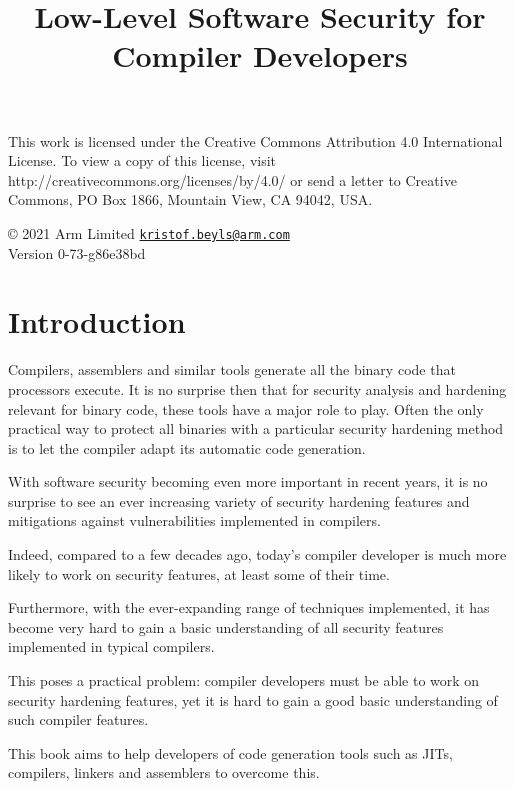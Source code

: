 \documentclass[a4paper,]{report}
\title{Low-Level Software Security for Compiler Developers}
\date{}
\begin{document}
\maketitle

\clearpage

\vspace*{\fill}
This work is licensed under the Creative Commons Attribution 4.0 International
License. To view a copy of this license, visit
http://creativecommons.org/licenses/by/4.0/ or send a letter to Creative
Commons, PO Box 1866, Mountain View, CA 94042, USA.

  © 2021 Arm Limited
  \href{mailto:kristof.beyls@arm.com}{\nolinkurl{kristof.beyls@arm.com}}\\

Version 0-73-g86e38bd
\clearpage

{
\hypersetup{linkcolor=}
\setcounter{tocdepth}{2}
\tableofcontents
}
\hypertarget{introduction}{%
\chapter{Introduction}\label{introduction}}

Compilers, assemblers and similar tools generate all the binary code
that processors execute. It is no surprise then that for security
analysis and hardening relevant for binary code, these tools have a
major role to play. Often the only practical way to protect all binaries
with a particular security hardening method is to let the compiler adapt
its automatic code generation.

With software security becoming even more important in recent years, it
is no surprise to see an ever increasing variety of security hardening
features and mitigations against vulnerabilities implemented in
compilers.

Indeed, compared to a few decades ago, today's compiler developer is
much more likely to work on security features, at least some of their
time.

Furthermore, with the ever-expanding range of techniques implemented, it
has become very hard to gain a basic understanding of all security
features implemented in typical compilers.

This poses a practical problem: compiler developers must be able to work
on security hardening features, yet it is hard to gain a good basic
understanding of such compiler features.

This book aims to help developers of code generation tools such as JITs,
compilers, linkers and assemblers to overcome this.
\end{document}
